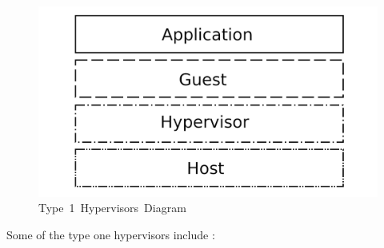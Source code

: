 \documentclass[
  14pt,
  english,
  a4paper,
]{scrreprt}
\begin{document}
\begin{figure}
\hypertarget{fig:type1hyp}{%
\centering
\includegraphics[width=1\textwidth,height=\textheight]{figures/Type-1-Hyp.png}
\caption{Type~1~Hypervisors~Diagram}\label{fig:type1hyp}
}
\end{figure}

Some of the type one hypervisors include :
\end{document}
